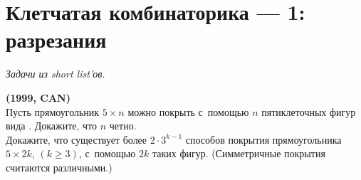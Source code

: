 
\section*{Клетчатая комбинаторика --- 1: разрезания}


\begingroup
\providecommand\ifincludesolutions{\iffalse}


\begingroup
    \def\divides{\mathrel{\vert}}
    \def\ndivides{\nmid}

\emph{Задачи из short list'ов.}

\ifincludesolutions
\textbf{Версия с решениями.}
\emph{Решения являются слабообработанным переводом с~английского.
Beware!}
\fi

\begin{problems}

\item\textbf{(1999, CAN)}
\\
\sp
Пусть прямоугольник $5 \times n$ можно покрыть с~помощью $n$ пятиклеточных
фигур вида .
Докажите, что $n$ четно.
\\
\sp
Докажите, что существует более $2 \cdot 3^{k-1}$ способов покрытия
прямоугольника $5 \times 2 k$, $(k \geq 3)$, с~помощью $2 k$ таких фигур.
(Симметричные покрытия считаются различными.)

\end{problems}

\ifincludesolutions
\setcounter{jeolmsubproblem}{0}%
\sp
Покрасим первый, третий и~пятый ряды в~красный, а~остальные квадратики в~белый.
Всего $n$ фигур и~$3 n$ красных квадратов.
Поскольку каждая фигура покрывает не~более трех красных квадратов, она должна
покрывать ровно 3 красных квадратика.
Отсюда следует, что два белых квадратика, покрытых фигурой, лежат в~одном ряду,
иначе их~будет не~менее трех.
Следовательно, каждый белый ряд разбивается на~пары квадратов, принадлежащих
одному кусочку.
Отсюда следует, что количество клеток в~ряду, равное $n$, четно.
\par
\sp
За~$a_k$ обозначим количество различных покрытий прямоугольника $5 \times 2k$.
За~$b_k$ обозначим количество покрытий, не~разбивающихся на~меньшие разбиения
вертикальной линией (без пересечения кусочков).
Легко видеть, что $a_1 = b_1 = 2$, $b_2 = 2$, $a_2 = 6 = 2 \cdot 3$, $b_3 = 4$,
и~далее, по~индукции, $b_{3k} \geq 4$, $b_{3k+1} \geq 2$ и~$b_{3k+2} \geq 2$.
Также $a_k = b_k + \sum_{i=1}^{k-1} b_i a_{k-i}$.
При $k \geq 3$ по~индукции
\[
    a_k
>
    2 + \sum_{i=1}^{k-1} 2 a_{k-i}
\geq
    2\cdot3^{k-1}+2a_{k-1}
\geq
    2\cdot 3^k
\, . \]
\fi %

